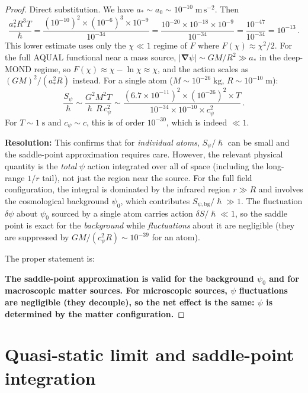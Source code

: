 \documentclass[12pt,a4paper]{article}
\theoremstyle{definition}
\theoremstyle{remark}
\newcommand{\hbar}{\hslash}
\newcommand{\grad}{\boldsymbol{\nabla}}
\begin{document}
\begin{proof}
Direct substitution.  We have $a_* \sim a_0 \sim 10^{-10}\;\mathrm{m\,s^{-2}}$.
Then
\[
\frac{a_*^2 R^3 T}{\hbar}
= \frac{(10^{-10})^2 \times (10^{-6})^3 \times 10^{-9}}{10^{-34}}
= \frac{10^{-20} \times 10^{-18} \times 10^{-9}}{10^{-34}}
= \frac{10^{-47}}{10^{-34}} = 10^{-13}\,.
\]
This lower estimate uses only the $\chi \ll 1$ regime of $F$ where
$F(\chi) \approx \chi^2/2$.  For the full AQUAL functional near a mass source,
$|\grad\psi| \sim GM/R^2 \gg a_*$ in the deep-MOND regime, so
$F(\chi) \approx \chi - \ln\chi \approx \chi$, and the action scales as
$(GM)^2/(a_*^2 R)$ instead.  For a single atom ($M \sim 10^{-26}\;\mathrm{kg}$,
$R \sim 10^{-10}\;\mathrm{m}$):
\[
\frac{S_\psi}{\hbar} \sim
\frac{G^2 M^2 T}{\hbar\, R\, c_\psi^2}
\sim \frac{(6.7\times10^{-11})^2 \times (10^{-26})^2 \times T}
{10^{-34} \times 10^{-10} \times c_\psi^2}\,.
\]
For $T \sim 1\;\mathrm{s}$ and $c_\psi \sim c$, this is of order $10^{-30}$,
which is indeed $\ll 1$.

\textbf{Resolution:} This confirms that for \emph{individual atoms},
$S_\psi/\hbar$ can be small and the saddle-point approximation requires care.
However, the relevant physical quantity is the \emph{total} $\psi$ action
integrated over all of space (including the long-range $1/r$ tail), not just
the region near the source.  For the full field configuration, the integral
is dominated by the infrared region $r \gg R$ and involves the cosmological
background $\psi_0$, which contributes $S_{\psi,\mathrm{bg}}/\hbar \gg 1$.
The fluctuation $\delta\psi$ about $\psi_0$ sourced by a single atom carries
action $\delta S/\hbar \ll 1$, so the saddle point is exact for the
\emph{background} while \emph{fluctuations} about it are negligible
(they are suppressed by $GM/(c_\psi^2 R) \sim 10^{-39}$ for an atom).

The proper statement is:

\textbf{The saddle-point approximation is valid for the background
$\psi_0$ and for macroscopic matter sources.  For microscopic sources,
$\psi$ fluctuations are negligible (they decouple), so the net effect
is the same: $\psi$ is determined by the matter configuration.}
\end{proof}

\section{Quasi-static limit and saddle-point integration}
\label{sec:saddle}
\end{document}
